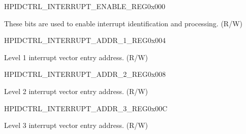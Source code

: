\begin{register}{H}{PIDCTRL\_INTERRUPT\_ENABLE\_REG}{0x000}\label{regdesc:PIDCTRLINTERRUPTENABLEREG}
    \regnewline%
    \begin{regdesc}\begin{reglist}
    \item [PIDCTRL\_INTERRUPT\_ENABLE]These bits are used to enable interrupt identification and processing. (R/W)
    \end{reglist}\end{regdesc}
    \end{register}
    
    
    \begin{register}{H}{PIDCTRL\_INTERRUPT\_ADDR\_1\_REG}{0x004}\label{regdesc:PIDCTRLINTERRUPTADDR1REG}
    \regnewline%
    \begin{regdesc}\begin{reglist}
    \item [PIDCTRL\_INTERRUPT\_ADDR\_1\_REG]Level 1 interrupt vector entry address. (R/W)
    \end{reglist}\end{regdesc}
    \end{register}
    
    
    \begin{register}{H}{PIDCTRL\_INTERRUPT\_ADDR\_2\_REG}{0x008}\label{regdesc:PIDCTRLINTERRUPTADDR2REG}
    \regnewline%
    \begin{regdesc}\begin{reglist}
    \item [PIDCTRL\_INTERRUPT\_ADDR\_2\_REG]Level 2 interrupt vector entry address. (R/W)
    \end{reglist}\end{regdesc}
    \end{register}
    
    
    \begin{register}{H}{PIDCTRL\_INTERRUPT\_ADDR\_3\_REG}{0x00C}\label{regdesc:PIDCTRLINTERRUPTADDR3REG}
    \regnewline%
    \begin{regdesc}\begin{reglist}
    \item [PIDCTRL\_INTERRUPT\_ADDR\_3\_REG]Level 3 interrupt vector entry address. (R/W)
    \end{reglist}\end{regdesc}
    \end{register}
    
